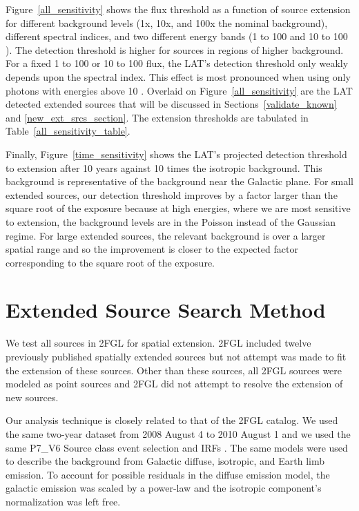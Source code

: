 \documentclass[12pt,preprint]{aastex}
\newcommand{\gev}{\text{GeV}\xspace}
\newcommand{\hl}[1]{#1}
\begin{document}
\hl{
Figure~\ref{all_sensitivity} shows the flux threshold
as a function of source extension for different background levels (1x,
10x, and 100x the nominal background), different spectral indices, and
two different energy bands (1 \gev to 100 \gev and 10 \gev to 100 \gev).  The detection
threshold is higher for sources in regions of higher background.  For a
fixed 1 \gev to 100 \gev or 10 \gev to 100 \gev flux, the LAT's detection threshold
only weakly depends upon the spectral index.  This effect is most
pronounced when using only photons with energies above 10 \gev.  Overlaid
on Figure~\ref{all_sensitivity} are the LAT detected extended sources
that will be discussed in Sections~\ref{validate_known}
and \ref{new_ext_srcs_section}.  The extension thresholds are tabulated
in Table~\ref{all_sensitivity_table}.

Finally, Figure~\ref{time_sensitivity} shows the LAT's projected
detection threshold to extension after 10 years against 10 times
the isotropic background. This background is representative of the
background near the Galactic plane.  For small extended sources, our
detection threshold improves by a factor larger than the square root
of the exposure because at high energies, where we are most sensitive
to extension, the background levels are in the Poisson instead of the
Gaussian regime.  For large extended sources, the relevant background
is over a larger spatial range and so the improvement is closer to the
expected factor corresponding to the square root of the exposure.
}


\section{Extended Source Search Method}
\label{extended_source_search_method}

We test all sources in 2FGL for spatial extension.
2FGL included
twelve previously published spatially extended sources but not
attempt was made to fit the extension of these sources. Other than these sources,
all 2FGL sources were modeled as point sources and 2FGL did not attempt
to resolve the extension of new sources.

Our analysis technique is closely related to that 
of the 2FGL catalog. We used the same two-year dataset from 2008 August 4
to 2010 August 1 and we used the same P7\_V6 Source class
event selection and IRFs \citep{lat_on_orbit_psf}.  
The same 
models were used to describe the background from Galactic diffuse, isotropic, and
Earth limb emission.  To account for possible residuals in the diffuse
emission model, the galactic emission was scaled by a power-law
and the isotropic component's normalization was left free.
\end{document}
